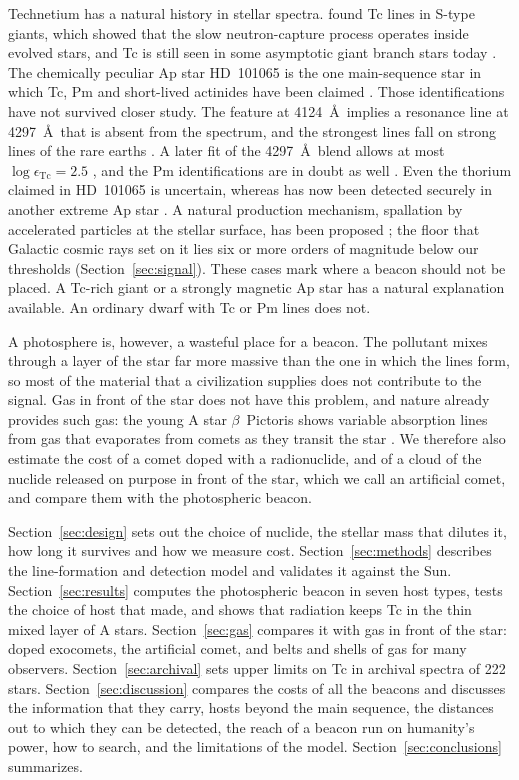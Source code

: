 \documentclass[final,5p]{elsarticle}
\begin{document}
Technetium has a natural history in stellar spectra. \citet{Merrill1952} found Tc lines in S-type giants, which showed that the slow neutron-capture process operates inside evolved stars, and Tc is still seen in some asymptotic giant branch stars today \citep{Shetye2022}. The chemically peculiar Ap star HD~101065 is the one main-sequence star in which Tc, Pm and short-lived actinides have been claimed \citep{Cowley2004, Fivet2007, Gopka2008}. Those identifications have not survived closer study. The  feature at 4124~\AA\ implies a resonance line at 4297~\AA\ that is absent from the spectrum, and the strongest  lines fall on strong lines of the rare earths \citep{Ryabchikova2008}. A later fit of the 4297~\AA\ blend allows at most $\log\epsilon_\mathrm{Tc} = 2.5$ \citep{Andrievsky2023tc}, and the Pm identifications are in doubt as well \citep{Ryabchikova2008, Andrievsky2023pm}. Even the thorium claimed in HD~101065 is uncertain, whereas  has now been detected securely in another extreme Ap star \citep{Chojnowski2023}. A natural production mechanism, spallation by accelerated particles at the stellar surface, has been proposed \citep{Goriely2007}; the floor that Galactic cosmic rays set on it lies six or more orders of magnitude below our thresholds (Section~\ref{sec:signal}). These cases mark where a beacon should not be placed. A Tc-rich giant or a strongly magnetic Ap star has a natural explanation available. An ordinary dwarf with Tc or Pm lines does not.

A photosphere is, however, a wasteful place for a beacon. The pollutant mixes through a layer of the star far more massive than the one in which the lines form, so most of the material that a civilization supplies does not contribute to the signal. Gas in front of the star does not have this problem, and nature already provides such gas: the young A star $\beta$~Pictoris shows variable absorption lines from gas that evaporates from comets as they transit the star \citep{Kiefer2014, Vrignaud2024a}. We therefore also estimate the cost of a comet doped with a radionuclide, and of a cloud of the nuclide released on purpose in front of the star, which we call an artificial comet, and compare them with the photospheric beacon.

Section~\ref{sec:design} sets out the choice of nuclide, the stellar mass that dilutes it, how long it survives and how we measure cost. Section~\ref{sec:methods} describes the line-formation and detection model and validates it against the Sun. Section~\ref{sec:results} computes the photospheric beacon in seven host types, tests the choice of host that \citet{Whitmire1980} made, and shows that radiation keeps Tc in the thin mixed layer of A stars. Section~\ref{sec:gas} compares it with gas in front of the star: doped exocomets, the artificial comet, and belts and shells of gas for many observers. Section~\ref{sec:archival} sets upper limits on Tc in archival spectra of 222 stars. Section~\ref{sec:discussion} compares the costs of all the beacons and discusses the information that they carry, hosts beyond the main sequence, the distances out to which they can be detected, the reach of a beacon run on humanity's power, how to search, and the limitations of the model. Section~\ref{sec:conclusions} summarizes.
\end{document}
